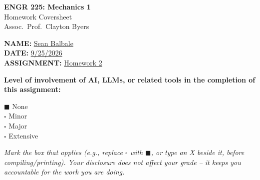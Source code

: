 \documentclass[11pt]{article}
\newcommand{\assignmentNumber}{2}
\newcommand{\assignedDate}{}
\newcommand{\dueDate}{}
\begin{document}
\begin{titlepage}
    \centering
    \vspace*{2cm}
    {\LARGE \bfseries ENGR 225: Mechanics 1} \\[0.3cm]
    {\Large Homework Coversheet} \\[0.3cm]
    {\large Assoc.\ Prof.\ Clayton Byers} \\[2cm]

    \begin{flushleft}
        \Large
        \textbf{NAME:} \underline{\hspace{2cm}Sean Balbale\hspace{2cm}} \\[1cm]
        \textbf{DATE:} \underline{\hspace{2cm}9/25/2026\hspace{2cm}} \\[1cm]
        \textbf{ASSIGNMENT:} \underline{\hspace{2cm}Homework 2\hspace{4cm}} \\[2cm]
    \end{flushleft}

    \large
    \textbf{Level of involvement of AI, LLMs, or related tools in the completion of this assignment:}

    \vspace{1cm}

    \begin{flushleft}
        \Large
        $\blacksquare$ \quad None \\[0.7cm]
        $\square$ \quad Minor \\[0.7cm]
        $\square$ \quad Major \\[0.7cm]
        $\square$ \quad Extensive \\[1.5cm]
    \end{flushleft}

    \normalsize
    \textit{Mark the box that applies (e.g., replace $\square$ with $\blacksquare$, or type an X beside it, before compiling/printing). Your disclosure does not affect your grade -- it keeps you accountable for the work you are doing.}

\end{titlepage}

\end{document}
